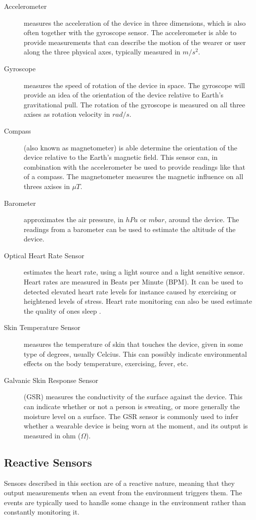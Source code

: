 \begin{description}
	\item[Accelerometer] measures the acceleration of the device in three dimensions, which is also often together with the gyroscope sensor. The accelerometer is able to provide measurements that can describe the motion of the wearer or user along the three physical axes, typically measured in $m/s^2$.
	\item[Gyroscope] measures the speed of rotation of the device in space. The gyroscope will provide an idea of the orientation of the device relative to Earth's gravitational pull. The rotation of the gyroscope is measured on all three axises as rotation velocity in $rad/s$.
	\item[Compass] (also known as magnetometer) is able determine the orientation of the device relative to the Earth's magnetic field. This sensor can, in combination with the accelerometer be used to provide readings like that of a compass. The magnetometer measures the magnetic influence on all threes axises in $\mu T$.
	\item[Barometer] approximates the air pressure, in $hPa$ or $mbar$, around the device. The readings from a barometer can be used to estimate the altitude of the device.
    \item[Optical Heart Rate Sensor] estimates the heart rate, using a light source and a light sensitive sensor. Heart rates are measured in Beats per Minute (BPM). It can be used to detected elevated heart rate levels for instance caused by exercising or heightened levels of stress. Heart rate monitoring can also be used estimate the quality of ones sleep \parencite{guardian_fitness_tracker_rem_sleep}. 
    \item[Skin Temperature Sensor] measures the temperature of skin that touches the device, given in some type of degrees, usually Celcius. This can possibly indicate environmental effects on the body temperature, exercising, fever, etc.
    \item[Galvanic Skin Response Sensor] (GSR) measures the conductivity of the surface against the device. This can indicate whether or not a person is sweating, or more generally the moisture level on a surface. The GSR sensor is commonly used to infer whether a wearable device is being worn at the moment, and its output is measured in ohm ($\Omega$).
\end{description}

\subsection{Reactive Sensors}
Sensors described in this section are of a reactive nature, meaning that they output measurements when an event from the environment triggers them. The events are typically used to handle some change in the environment rather than constantly monitoring it.

